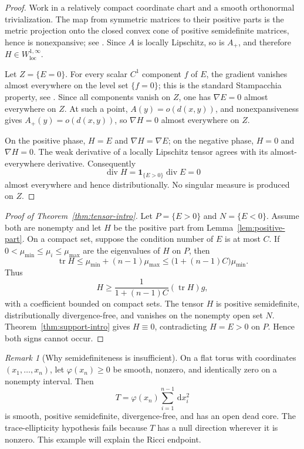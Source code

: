 \documentclass[11pt,reqno]{amsart}
\theoremstyle{definition}
\theoremstyle{remark}
\newtheorem{remark}[theorem]{Remark}
\newcommand{\tr}{\operatorname{tr}}
\newcommand{\diver}{\operatorname{div}}
\newcommand{\dd}{\,\mathrm d}
\begin{document}
\begin{proof}
Work in a relatively compact coordinate chart and a smooth orthonormal trivialization.  The map from symmetric matrices to their positive parts is the metric projection onto the closed convex cone of positive semidefinite matrices, hence is nonexpansive; see \cite[Chapter 4]{BauschkeCombettes}.  Since $A$ is locally Lipschitz, so is $A_+$, and therefore $H\in W^{1,\infty}_{\mathrm{loc}}$.

Let $Z=\{E=0\}$.  For every scalar $C^1$ component $f$ of $E$, the gradient vanishes almost everywhere on the level set $\{f=0\}$; this is the standard Stampacchia property, see \cite[Section 4.2]{EvansGariepy}.  Since all components vanish on $Z$, one has $\nabla E=0$ almost everywhere on $Z$.  At such a point, $A(y)=o(d(x,y))$, and nonexpansiveness gives $A_+(y)=o(d(x,y))$, so $\nabla H=0$ almost everywhere on $Z$.

On the positive phase, $H=E$ and $\nabla H=\nabla E$; on the negative phase, $H=0$ and $\nabla H=0$.  The weak derivative of a locally Lipschitz tensor agrees with its almost-everywhere derivative.  Consequently
\[
\diver H=\mathbf 1_{\{E>0\}}\diver E=0
\]
almost everywhere and hence distributionally.  No singular measure is produced on $Z$.
\end{proof}

\begin{proof}[Proof of Theorem~\ref{thm:tensor-intro}]
Let $P=\{E>0\}$ and $N=\{E<0\}$.  Assume both are nonempty and let $H$ be the positive part from Lemma~\ref{lem:positive-part}.  On a compact set, suppose the condition number of $E$ is at most $C$.  If $0<\mu_{\min}\le\mu_i\le\mu_{\max}$ are the eigenvalues of $H$ on $P$, then
\[
\tr H\le\mu_{\min}+(n-1)\mu_{\max}
\le\bigl(1+(n-1)C\bigr)\mu_{\min}.
\]
Thus
\[
H\ge\frac1{1+(n-1)C}(\tr H)g,
\]
with a coefficient bounded on compact sets.  The tensor $H$ is positive semidefinite, distributionally divergence-free, and vanishes on the nonempty open set $N$.  Theorem~\ref{thm:support-intro} gives $H\equiv0$, contradicting $H=E>0$ on $P$.  Hence both signs cannot occur.
\end{proof}

\begin{remark}[Why semidefiniteness is insufficient]\label{rem:semidefinite-deadcore}
On a flat torus with coordinates $(x_1,\dots,x_n)$, let $\varphi(x_n)\ge0$ be smooth, nonzero, and identically zero on a nonempty interval.  Then
\[
T=\varphi(x_n)\sum_{i=1}^{n-1}\dd x_i^2
\]
is smooth, positive semidefinite, divergence-free, and has an open dead core.  The trace-ellipticity hypothesis fails because $T$ has a null direction wherever it is nonzero.  This example will explain the Ricci endpoint.
\end{remark}
\end{document}
